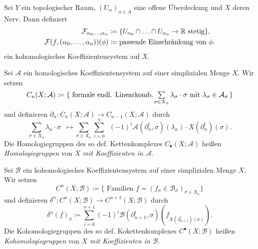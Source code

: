 \documentclass{cheat-sheet}
\newcommand{\nspace}[1]{\foreach \i in {1,...,#1}{ \! }} %
\begin{document}

\begin{bsp}
  Sei $Y$ ein topologischer Raum, $(U_\alpha)_{\alpha \in A}$ eine offene Überdeckung und $X$ deren Nerv. Dann definiert
  \begin{align*}
    \mathcal{F}_{\alpha_0, \ldots, \alpha_n} & \coloneqq \{ U_{\alpha_0} \cap \ldots \cap U_{\alpha_n} \to \mathbb{R} \text{ stetig} \}, \\
    \mathcal{F}(f, (\alpha_0, \ldots, \alpha_n))(\phi) & \coloneqq \text{passende Einschränkung von $\phi$}.
  \end{align*}
  ein kohomologisches Koeffizientensystem auf $X$.
\end{bsp}


\begin{defn}
  Sei $\mathcal{A}$ ein homologisches Koeffizientensystem auf einer simplizialen Menge $X$. Wir setzen
  \[ C_n(X; \mathcal{A}) \coloneqq \{ \text{ formale endl. Linearkomb. } \nspace{3} \sum_{\sigma \in X_n} \lambda_\sigma \cdot \sigma \text{ mit } \lambda_\sigma \in \mathcal{A}_\sigma \, \} \]
  und definieren $\partial_n : C_n(X; \mathcal{A}) \to C_{n-1}(X; \mathcal{A})$ durch
  \[ \sum_{\sigma \in X_n} \lambda_\sigma \cdot \sigma \enspace \mapsto \sum_{\sigma \in X_n} \sum_{i=0}^n \enspace (-1)^i \mathcal{A}(\partial_n^i, \sigma)(\lambda_\sigma) \cdot X(\partial_n^i)(\sigma). \]
  Die Homologiegruppen des so def. Kettenkomplexes $C_\bullet(X; \mathcal{A})$ heißen \emph{Homologiegruppen} von $X$ \emph{mit Koeffizienten in $\mathcal{A}$}.
\end{defn}

\begin{defn}
  Sei $\mathcal{B}$ ein kohomologisches Koeffizientensystem auf einer simplizialen Menge $X$. Wir setzen
  \[ C^n(X; \mathcal{B}) \coloneqq \{ \text{ Familien } f = (f_\sigma \in \mathcal{B}_\sigma)_{\sigma \in X_n} \} \]
  und definieren $\delta^n : C^n(X; \mathcal{B}) \to C^{n+1}(X; \mathcal{B})$ durch
  \[ \delta^n(f)_\sigma \coloneqq \sum_{i=0}^{n+1} (-1)^i \mathcal{B}(\partial_{n+1}^i, \sigma)(f_{X(\partial_{n+1}^i)(\sigma)}). \]
  Die Kohomologiegruppen des so def. Kokettenkomplexes $C^\bullet(X; \mathcal{B})$ heißen \emph{Kohomologiegruppen} von $X$ \emph{mit Koeffizienten in $\mathcal{B}$}.
\end{defn}
\end{document}
